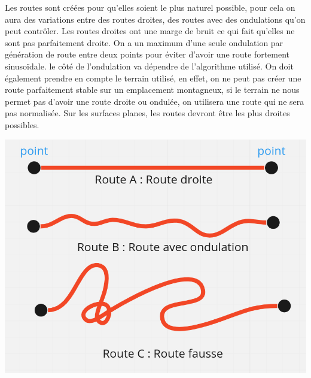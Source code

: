 {
Les routes sont créées pour qu'elles soient le plus naturel possible, pour cela on aura des variations entre des routes droites, des routes avec des ondulations qu’on peut contrôler.
Les routes droites ont une marge de bruit ce qui fait qu'elles ne sont pas parfaitement droite.
On a un maximum d’une seule ondulation par génération de route entre deux points pour éviter d’avoir une route fortement sinusoïdale. le côté de l’ondulation va dépendre de l’algorithme utilisé. 
On doit également prendre en compte le terrain utilisé, en effet, on ne peut pas créer une route parfaitement stable sur un emplacement montagneux, si le terrain ne nous permet pas d'avoir une route droite ou ondulée, on utilisera une route qui ne sera pas normalisée. Sur les surfaces planes, les routes devront être les plus droites possibles.

\begin{center}
    \centering
    \includegraphics[height = 5 cm]{images/types_de_routes.png}
\end{center}
}
{}

